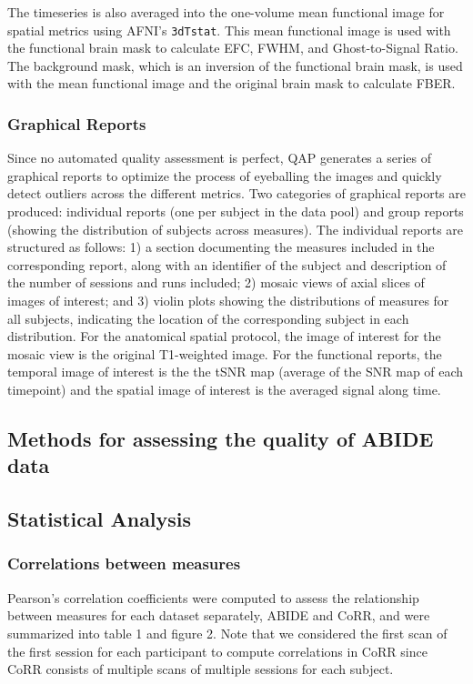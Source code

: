 \documentclass{frontiersSCNS} %
\begin{document}
The timeseries is also averaged into the one-volume mean functional image for spatial metrics using AFNI's \texttt{3dTstat}. This mean functional image is used with the functional brain mask to calculate EFC, FWHM, and Ghost-to-Signal Ratio. The background mask, which is an inversion of the functional brain mask, is used with the mean functional image and the original brain mask to calculate FBER.

\subsubsection{Graphical Reports}
\label{sec:21b}

Since no automated quality assessment is perfect, QAP generates a series of graphical reports to optimize the process of eyeballing the images and quickly detect
outliers across the different metrics.
Two categories of graphical reports are produced: individual reports (one per subject in the data pool) and group reports (showing the distribution of subjects across
measures). The individual reports are structured as follows: 1) a section documenting the measures included in the corresponding report, along with an identifier of
the subject and description of the number of sessions and runs included; 2) mosaic views of axial slices of images of interest; and 3) violin plots showing the
distributions of measures for all subjects, indicating the location of the corresponding subject in each distribution.
For the anatomical spatial protocol, the image of interest for the mosaic view is the original T1-weighted image. For the functional reports, the temporal image
of interest is the the tSNR map (average of the SNR map of each timepoint) and the spatial image of interest is the averaged signal along time.

\subsection{Methods for assessing the quality of ABIDE data}
\label{sec:23}

\subsection{Statistical Analysis}
\label{sec:24}

\subsubsection{Correlations between measures}
\label{sec:25}
Pearson’s correlation coefficients were computed to assess the relationship between measures for each dataset separately, ABIDE and CoRR, and were summarized into table 1 and figure 2. Note that we considered the first scan of the first session for each participant to compute correlations in CoRR since CoRR consists of multiple scans of multiple sessions for each subject.
\end{document}
